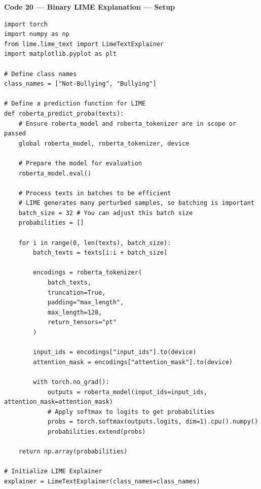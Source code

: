 \documentclass[11pt,a4paper]{article}
\begin{document}
\noindent\textbf{Code 20 --- Binary LIME Explanation --- Setup}
\begin{lstlisting}
import torch
import numpy as np
from lime.lime_text import LimeTextExplainer
import matplotlib.pyplot as plt

# Define class names
class_names = ["Not-Bullying", "Bullying"]

# Define a prediction function for LIME
def roberta_predict_proba(texts):
    # Ensure roberta_model and roberta_tokenizer are in scope or passed
    global roberta_model, roberta_tokenizer, device

    # Prepare the model for evaluation
    roberta_model.eval()

    # Process texts in batches to be efficient
    # LIME generates many perturbed samples, so batching is important
    batch_size = 32 # You can adjust this batch size
    probabilities = []

    for i in range(0, len(texts), batch_size):
        batch_texts = texts[i:i + batch_size]

        encodings = roberta_tokenizer(
            batch_texts,
            truncation=True,
            padding="max_length",
            max_length=128,
            return_tensors="pt"
        )

        input_ids = encodings["input_ids"].to(device)
        attention_mask = encodings["attention_mask"].to(device)

        with torch.no_grad():
            outputs = roberta_model(input_ids=input_ids, attention_mask=attention_mask)
            # Apply softmax to logits to get probabilities
            probs = torch.softmax(outputs.logits, dim=1).cpu().numpy()
            probabilities.extend(probs)

    return np.array(probabilities)

# Initialize LIME Explainer
explainer = LimeTextExplainer(class_names=class_names)
\end{lstlisting}
\end{document}
